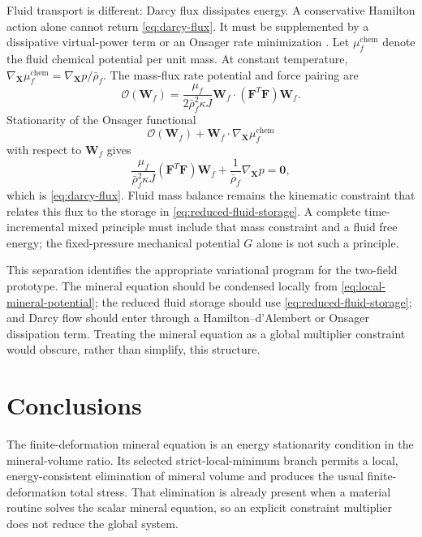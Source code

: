 \documentclass[11pt]{article}
\newcommand{\mbf}[1]{\mathbf{#1}}
\begin{document}
Fluid transport is different: Darcy flux dissipates energy.  A conservative
Hamilton action alone cannot return \cref{eq:darcy-flux}.  It must be
supplemented by a dissipative virtual-power term or an Onsager rate
minimization \citep{bedford1979variational,doi2011onsager}.  Let
\(\mu_f^{\mathrm{chem}}\) denote the fluid chemical potential per unit mass.
At constant temperature,
\(\nabla_{\mbf X}\mu_f^{\mathrm{chem}}=\nabla_{\mbf X}p/\bar\rho_f\).
The
mass-flux rate potential and force pairing are
\begin{equation}
 \mathcal O(\mbf W_f)
 =\frac{\mu_f}{2\bar\rho_f^2\kappa J}
 \mbf W_f\mathbin{\cdot}
 \left(\mbf F^T\mbf F\right)\mbf W_f.
 \label{eq:darcy-onsager-potential}
\end{equation}
Stationarity of the Onsager functional
\begin{equation}
 \mathcal O(\mbf W_f)+\mbf W_f\mathbin{\cdot}
 \nabla_{\mbf X}\mu_f^{\mathrm{chem}}
 \label{eq:darcy-onsager-functional}
\end{equation}
with respect to \(\mbf W_f\) gives
\begin{equation}
 \frac{\mu_f}{\bar\rho_f^2\kappa J}
 \left(\mbf F^T\mbf F\right)\mbf W_f
 +\frac{1}{\bar\rho_f}\nabla_{\mbf X}p=\mbf0,
 \label{eq:darcy-onsager-stationarity}
\end{equation}
which is \cref{eq:darcy-flux}.  Fluid mass balance remains the kinematic
constraint that relates this flux to the storage in
\cref{eq:reduced-fluid-storage}.  A complete time-incremental mixed
principle must include that mass constraint and a fluid free energy; the
fixed-pressure mechanical potential \(G\) alone is not such a principle.

This separation identifies the appropriate variational program for the
two-field prototype.  The mineral equation should be condensed locally from
\cref{eq:local-mineral-potential}; the reduced fluid storage should use
\cref{eq:reduced-fluid-storage}; and Darcy flow should enter through a
Hamilton--d'Alembert or Onsager dissipation term.  Treating the mineral
equation as a global multiplier constraint would obscure, rather than
simplify, this structure.

\section{Conclusions}
\label{sec:conclusions}

The finite-deformation mineral equation is an energy stationarity condition
in the mineral-volume ratio.  Its selected strict-local-minimum branch permits a local,
energy-consistent elimination of mineral volume and produces the usual
finite-deformation total stress.  That elimination is already present when a
material routine solves the scalar mineral equation, so an explicit
constraint multiplier does not reduce the global system.
\end{document}
